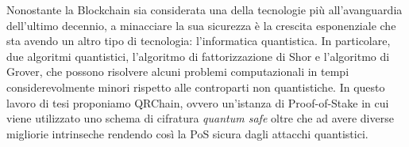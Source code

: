 Nonostante la Blockchain sia considerata una della tecnologie più all'avanguardia dell'ultimo decennio, a minacciare la sua sicurezza è la crescita esponenziale che sta avendo un altro tipo di tecnologia: l'informatica quantistica. In particolare, due algoritmi quantistici, l'algoritmo di fattorizzazione di Shor e l'algoritmo di Grover, che possono risolvere alcuni problemi computazionali in tempi considerevolmente minori rispetto alle controparti non quantistiche. In questo lavoro di tesi proponiamo QRChain, ovvero un'istanza di Proof-of-Stake in cui viene utilizzato uno schema di cifratura \textit{quantum safe} oltre che ad avere diverse migliorie intrinseche rendendo così la PoS sicura dagli attacchi quantistici.